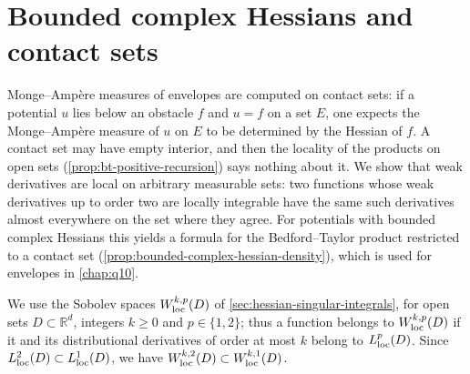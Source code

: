 \section{Bounded complex Hessians and contact sets}
\label{sec:bounded-complex-hessian-contact}

Monge--Amp\`ere measures of envelopes are computed on contact sets: if a potential $u$ lies below an obstacle $f$ and $u=f$ on a set $E$, one expects the Monge--Amp\`ere measure of $u$ on $E$ to be determined by the Hessian of $f$. A contact set may have empty interior, and then the locality of the products on open sets (\cref{prop:bt-positive-recursion}) says nothing about it. We show that weak derivatives are local on arbitrary measurable sets: two functions whose weak derivatives up to order two are locally integrable have the same such derivatives almost everywhere on the set where they agree. For potentials with bounded complex Hessians this yields a formula for the Bedford--Taylor product restricted to a contact set (\cref{prop:bounded-complex-hessian-density}), which is used for envelopes in \cref{chap:q10}.

We use the Sobolev spaces $W^{k,p}_{\mathrm{loc}}(D)$ of \cref{sec:hessian-singular-integrals}, for open sets $D\subset\mathbb R^d$, integers $k\ge0$ and $p\in\{1,2\}$; thus a function belongs to $W^{k,p}_{\mathrm{loc}}(D)$ if it and its distributional derivatives of order at most $k$ belong to $L^p_{\mathrm{loc}}(D)$. Since $L^2_{\mathrm{loc}}(D)\subset L^1_{\mathrm{loc}}(D)$, we have $W^{k,2}_{\mathrm{loc}}(D)\subset W^{k,1}_{\mathrm{loc}}(D)$.

